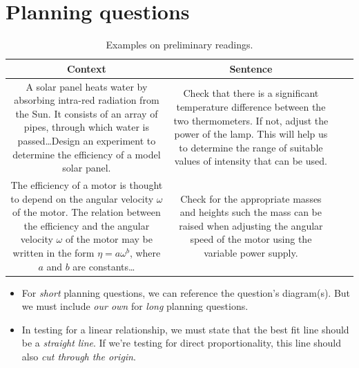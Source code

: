 \documentclass[oneside]{book}
\begin{document}
\section{Planning questions}
\begin{table}[H]
    \centering
    \begin{tabular}{|Sc|Sc|}
        \hline
        Context & Sentence\\
        \hline
        \begin{minipage}{0.5\textwidth-25.2pt}
            A solar panel heats water by absorbing intra-red radiation from the Sun. It consists of an array of pipes, through which water is passed\dots Design an experiment to determine the efficiency of a model solar panel.
        \end{minipage}&
        \begin{minipage}{0.5\textwidth-25.2pt}
            Check that there is a significant temperature difference between the two thermometers. If not, adjust the power of the lamp. This will help us to determine the range of suitable values of intensity that can be used.
        \end{minipage}\\
        \hline
        \begin{minipage}{0.5\textwidth-25.2pt}
            The efficiency of a motor is thought to depend on the angular velocity \(\omega\) of the motor. The relation between the efficiency and the angular velocity \(\omega\) of the motor may be written in the form \(\eta=a\omega^b\), where \(a\) and \(b\) are constants\dots
        \end{minipage}&
        \begin{minipage}{0.5\textwidth-25.2pt}
            Check for the appropriate masses and heights such the mass can be raised when adjusting the angular speed of the motor using the variable power supply.
        \end{minipage}\\
        \hline
    \end{tabular}
    \caption{Examples on preliminary readings.}
    \label{table:preliminary-readings}
\end{table}
\begin{itemize}
    \item For \emph{short} planning questions, we can reference the question's diagram(s). But we must include \emph{our own} for \emph{long} planning questions.
    \item In testing for a linear relationship, we must state that the best fit line should be a \emph{straight line}. If we're testing for direct proportionality, this line should also \emph{cut through the origin}. 
\end{itemize}
\end{document}
